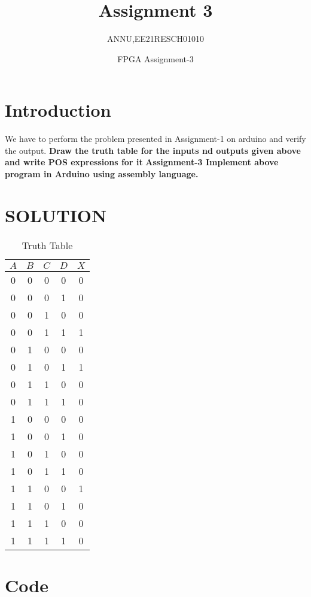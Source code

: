 \documentclass{article}
\title{Assignment 3}
\author{ANNU,EE21RESCH01010}
\date{FPGA Assignment-3}
\begin{document}
\maketitle

\section{Introduction}

We have to perform the problem presented in Assignment-1 on arduino and verify the output.
\textbf{Draw the truth table for the inputs nd outputs given above and write POS expressions for it}
\textbf{Assignment-3 Implement above program in Arduino using assembly language.}
\section{SOLUTION}

\begin{table}[h] 
    \centering
    \begin{tabular}{|c|c|c|c|c|}
    \hline
    $A$&$B$&$C$&$D$&$X$  \\
    \hline
    0&0&0&0&0\\
    0&0&0&1&0\\
    0&0&1&0&0\\
    0&0&1&1&1\\
    0&1&0&0&0\\
    0&1&0&1&1\\
    0&1&1&0&0\\
    0&1&1&1&0\\
    1&0&0&0&0\\
    1&0&0&1&0\\
    1&0&1&0&0\\
    1&0&1&1&0\\
    1&1&0&0&1\\
    1&1&0&1&0\\
    1&1&1&0&0\\
    1&1&1&1&0\\
    \hline
    \end{tabular}
    \caption{Truth Table}
    \label{table:tt}
\end{table}



\newpage

\section{Code}
\end{document}

